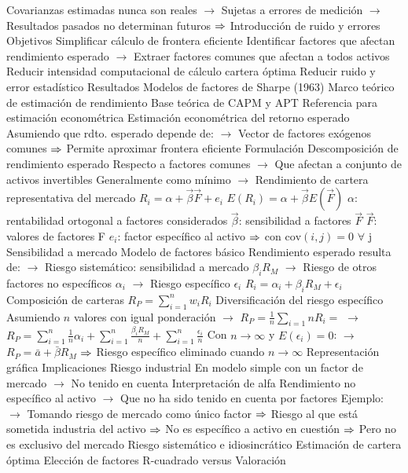 \documentclass{nuevotema}
\begin{document}
\begin{esquemal}
				\4[] Covarianzas estimadas nunca son reales
				\4[] $\to$ Sujetas a errores de medición
				\4[] $\to$ Resultados pasados no determinan futuros
				\4[] $\then$ Introducción de ruido y errores
				\4 Objetivos
				\4[] Simplificar cálculo de frontera eficiente
				\4[] Identificar factores que afectan rendimiento esperado
				\4[] $\to$ Extraer factores comunes que afectan a todos activos
				\4[] Reducir intensidad computacional de cálculo cartera óptima
				\4[] Reducir ruido y error estadístico
				\4 Resultados
				\4[] Modelos de factores de Sharpe (1963)
				\4[] Marco teórico de estimación de rendimiento
				\4[] Base teórica de CAPM y APT
				\4[] Referencia para estimación econométrica
				\4[] Estimación econométrica del retorno esperado
				\4[] Asumiendo que rdto. esperado depende de:
				\4[] $\to$ Vector de factores exógenos comunes
				\4[] $\then$ Permite aproximar frontera eficiente
			\3 Formulación
				\4 Descomposición de rendimiento esperado
				\4[] Respecto a factores comunes
				\4[] $\to$ Que afectan a conjunto de activos invertibles
				\4[] Generalmente como mínimo
				\4[] $\to$ Rendimiento de cartera representativa del mercado
				\4 $R_i = \alpha + \vec{\beta} \vec{F} + e_i$
				\4[$\then$] $E(R_i) = \alpha + \vec{\beta} E(\vec{F})$
				\4[] $\alpha$: rentabilidad ortogonal a factores considerados
				\4[] $\vec{\beta}$: sensibilidad a factores $\vec{F}$
				\4[] $\vec{F}$: valores de factores F
				\4[] $e_i$: factor específico al activo
				\4[] $\then$ con $\text{cov}(i,j)=0$ $\forall$ j
				\4 Sensibilidad a mercado
				\4[] Modelo de factores básico
				\4[] Rendimiento esperado resulta de:
				\4[] $\to$ Riesgo sistemático: sensibilidad a mercado $\beta_i R_M$
				\4[] $\to$ Riesgo de otros factores no específicos $\alpha_i$
				\4[] $\to$ Riesgo específico $\epsilon_i$
				\4[] $R_i = \alpha_i + \beta_i R_M + \epsilon_i$
				\4 Composición de carteras
				\4[] $R_P = \sum_{i=1}^n w_i R_i$
				\4 Diversificación del riesgo específico
				\4[] Asumiendo $n$ valores con igual ponderación
				\4[] $\to$ $R_P = \frac{1}{n} \sum_{i=1}{n} R_i =$
				\4[] $\to$ $R_P =  \sum_{i=1}^n \frac{1}{n} \alpha_i+ \sum_{i=1}^{n} \frac{\beta_i R_M }{n} +  \sum_{i=1}^{n} \frac{  \epsilon_i}{n}$
				\4[] Con $n\to \infty$ y $E(\epsilon_i) = 0$:
				\4[] $\to$ $R_P = \bar{a} + \bar{\beta} R_M $
				\4[] $\then$ Riesgo específico eliminado cuando $n\to \infty$
				\4[] Representación gráfica
				\4[] 
			\3 Implicaciones
				\4 Riesgo industrial
				\4[] En modelo simple con un factor de mercado
				\4[] $\to$ No tenido en cuenta
				\4 Interpretación de alfa
				\4[] Rendimiento no específico al activo
				\4[] $\to$ Que no ha sido tenido en cuenta por factores
				\4[] Ejemplo:
				\4[] $\to$ Tomando riesgo de mercado como único factor
				\4[] $\then$ Riesgo al que está sometida industria del activo
				\4[] $\then$ No es específico a activo en cuestión
				\4[] $\then$ Pero no es exclusivo del mercado
				\4 Riesgo sistemático e idiosincrático
				\4 Estimación de cartera óptima
				\4 Elección de factores
				\4 R-cuadrado versus
			\3 Valoración


\end{esquemal}
\end{document}
